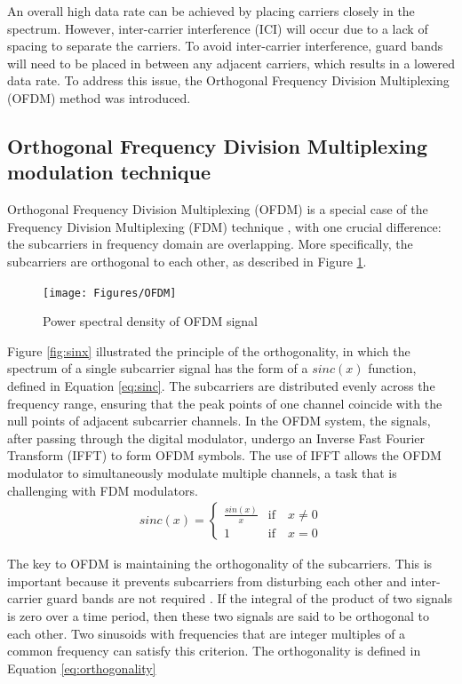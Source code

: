 An overall high data rate can be achieved by placing carriers closely in the spectrum. However, inter-carrier interference (ICI) will occur due to a lack of spacing to separate the carriers. To avoid inter-carrier interference, guard bands will need to be placed in between any adjacent carriers, which results in a lowered data rate. To address this issue, the 
Orthogonal Frequency Division Multiplexing (OFDM) method was introduced.

\subsection{Orthogonal Frequency Division Multiplexing modulation technique}
Orthogonal Frequency Division Multiplexing (OFDM) is a special case of the Frequency Division Multiplexing (FDM) technique \cite{OFDM2010}, with one crucial difference: the subcarriers in frequency domain are overlapping. More specifically, the subcarriers are orthogonal to each other, as described in Figure \ref{fig:OFDM}.

\begin{figure}[htbp]
    \centering
    \texttt{[image: Figures/OFDM]}
    \caption{Power spectral density of OFDM signal}
    \label{fig:OFDM}
\end{figure}

Figure \ref{fig:sinx} illustrated the principle of the orthogonality, in which the spectrum of a single subcarrier signal has the form of a $sinc(x)$ function, defined in Equation \ref{eq:sinc}. The subcarriers are distributed evenly across the frequency range, ensuring that the peak points of one channel coincide with the null points of adjacent subcarrier channels. In the OFDM system, the signals, after passing through the digital modulator, undergo an Inverse Fast Fourier Transform (IFFT) to form OFDM symbols. The use of IFFT allows the OFDM modulator to simultaneously modulate multiple channels, a task that is challenging with FDM modulators.
\begin{align}\label{eq:sinc}
    sinc(x) =
    \begin{cases}
        \frac{sin(x)}{x} &\text{if} \quad x \neq 0\\
        1 &\text{if} \quad x = 0
    \end{cases}
\end{align}

The key to OFDM is maintaining the orthogonality of the subcarriers. This is important because it prevents subcarriers from disturbing each other and inter-carrier guard bands are not required \cite{wikiOFDM}. If the integral of the product of two signals is zero over a time period, then these two signals are said to be orthogonal to each other. Two sinusoids with frequencies that are integer multiples of a common frequency can satisfy this criterion. The orthogonality is defined in Equation \ref{eq:orthogonality}

